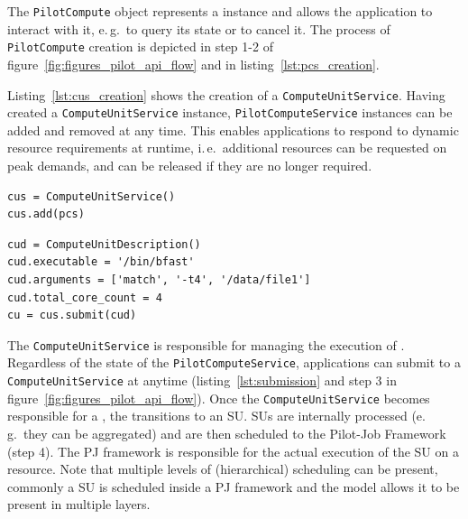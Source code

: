 \documentclass{sig-alternate}
\begin{document}
The \texttt{Pilot\-Compute} object represents a \pilot instance and allows the 
application to interact with it, e.\,g.\ to query its state or to cancel 
it. The process of \texttt{Pilot\-Compute} creation is depicted in step 1-2 of 
figure~\ref{fig:figures_pilot_api_flow} and in listing~\ref{lst:pcs_creation}.

Listing~\ref{lst:cus_creation} shows the creation of
a \texttt{Compute\-Unit\-Service}.  Having created
a \texttt{Compute\-Unit\-Service} instance, \texttt{Pilot\-Compute\-Service}
instances can be added and removed at any time.  This enables applications to
respond to dynamic resource requirements at runtime, i.\,e.\ additional
resources can be requested on peak demands, and can be released if they are no
longer required.\\

\begin{minipage}{0.45 \textwidth}
\begin{lstlisting}[caption={\textbf{ComputeUnitService Creation:} Instantiation
of a \texttt{ComputeUnitService} using a reference to the
\texttt{PilotComputeService}.}, label={lst:cus_creation}]
cus = ComputeUnitService()
cus.add(pcs)
\end{lstlisting}

\end{minipage}

\begin{minipage}{0.45 \textwidth}
\begin{lstlisting}[caption={\textbf{ComputeUnit Submission:} Instantiation and 
	submission of a \texttt{ComputeUnitDescription}.}, label={lst:submission}] 
cud = ComputeUnitDescription()
cud.executable = '/bin/bfast'
cud.arguments = ['match', '-t4', '/data/file1']
cud.total_core_count = 4
cu = cus.submit(cud)
\end{lstlisting}

\end{minipage}


The \texttt{Compute\-Unit\-Service} is responsible for managing the execution of
\cus.
Regardless of the state of the \texttt{Pilot\-Compute\-Service}, applications can submit \cus to a
\texttt{Compute\-Unit\-Service} at anytime (listing~\ref{lst:submission} and step 3
in figure~\ref{fig:figures_pilot_api_flow}). 
Once the \texttt{Compute\-Unit\-Service} becomes responsible for a \cu, the \cu
transitions to an SU.
SUs are internally processed (e.\,g.\ they can be aggregated) and are then scheduled to the Pilot-Job Framework (step 4). 
The PJ framework is responsible for the actual execution of the SU on a
resource.
Note that multiple levels of (hierarchical) scheduling can be present, commonly
a SU is scheduled inside a PJ framework and the model allows it to be present
in multiple layers.
\end{document}
